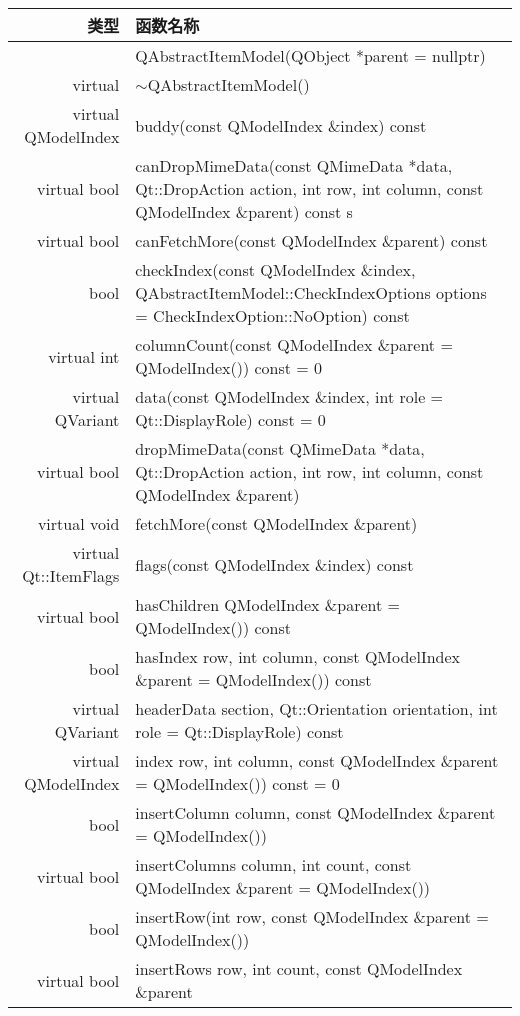 \begin{longtable}{|r|l|}
\hline
类型 & 函数名称 \\
\hline
& QAbstractItemModel(QObject *parent = nullptr)\\
\hline
virtual	& $\sim$QAbstractItemModel()\\
\hline
virtual QModelIndex	& buddy(const QModelIndex \&index) const\\
\hline
virtual bool & canDropMimeData(const QMimeData *data, Qt::DropAction
               action, int row, int column, const QModelIndex
               \&parent) const s\\
\hline
virtual bool &canFetchMore(const QModelIndex \&parent) const\\
\hline
bool & checkIndex(const QModelIndex \&index,
       QAbstractItemModel::CheckIndexOptions options =
       CheckIndexOption::NoOption) const\\
\hline
virtual int&columnCount(const QModelIndex \&parent = QModelIndex())
             const = 0\\
\hline
virtual QVariant&	data(const QModelIndex \&index, int role = Qt::DisplayRole) const = 0\\
\hline
virtual bool&	dropMimeData(const QMimeData *data, Qt::DropAction
              action, int row, int column, const QModelIndex \&parent)\\
\hline
virtual void&	fetchMore(const QModelIndex \&parent)\\
\hline
virtual Qt::ItemFlags&	flags(const QModelIndex \&index) const\\
\hline
virtual bool&	hasChildren QModelIndex \&parent = QModelIndex()) const\\
\hline
bool	&hasIndex row, int column, const QModelIndex \&parent = QModelIndex()) const\\
\hline
virtual QVariant	&headerData section, Qt::Orientation orientation, int role = Qt::DisplayRole) const\\
\hline
virtual QModelIndex& index row, int column, const QModelIndex \&parent = QModelIndex()) const = 0\\
\hline
bool	&insertColumn column, const QModelIndex \&parent = QModelIndex())\\
\hline
virtual bool & insertColumns column, int count, const QModelIndex \&parent = QModelIndex())\\
\hline
bool&	insertRow(int row, const QModelIndex \&parent = QModelIndex())\\
\hline
virtual bool&	insertRows row, int count, const QModelIndex \&parent

\end{longtable}
